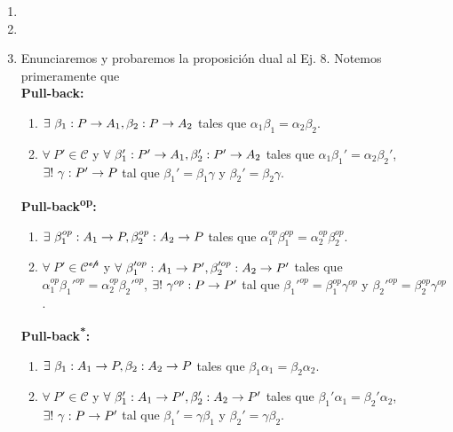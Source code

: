 \documentclass{article}
\begin{document}
\begin{enumerate}[label=\textbf{Ej \arabic*.}]
\begin{proof}
		\begin{equation*}
			\commutativesquare{up=t, P=A_2, A=P,B=A_2,C=A_1,D=A,f=\beta_2,g=\beta_1,h=\alpha_2,k=\alpha_1, l=1_{A_2},m=\alpha,n=\exists !\ \gamma,},
		\end{equation*}
		del cual se deduce que en partícular $\beta_2\gamma=1_{A_2}$, y así se tiene lo deseado.\\
		\end{proof}
		\item 
		\item
		\item Enunciaremos y probaremos la proposición dual al Ej. 8. Notemos primeramente que\\
		\textbf{Pull-back:}\begin{enumerate}[label=PB\Roman*)]
			\item $\exists\ \catarrow{\beta_1}{P}{A_1},\catarrow{\beta_2}{P}{A_2}$ tales que $\alpha_1\beta_1=\alpha_2\beta_2$.
			\item $\forall\ P'\in\mathscr{C}$ y $\forall\ \catarrow{\beta_1'}{P'}{A_1},\catarrow{\beta_2'}{P'}{A_2}$ tales que $\alpha_1\beta_1'=\alpha_2\beta_2'$, $\exists !\ \gamma:P'\to P$ tal que $\beta_1'=\beta_1\gamma$ y $\beta_2'=\beta_2\gamma$.
		\end{enumerate}
		\textbf{Pull-back\textsuperscript{op}:}\begin{enumerate}[label=PB\textsuperscript{op}\Roman*)]
		\item $\exists\ \catarrow{\beta_1^{op}}{A_1}{P},\catarrow{\beta_2^{op}}{A_2}{P}$ tales que $\alpha_1^{op}\beta_1^{op}=\alpha_2^{op}\beta_2^{op}$.
		\item $\forall\ P'\in\mathscr{C^{op}}$ y $\forall\ \catarrow{\beta_1'^{op}}{A_1}{P'},\catarrow{\beta_2'^{op}}{A_2}{P'}$ tales que $\alpha_1^{op}\beta_1'^{op}=\alpha_2^{op}\beta_2'^{op}$, $\exists !\ \catarrow{\gamma^{op}}{P}{P'}$ tal que $\beta_1'^{op}=\beta_1^{op}\gamma^{op}$ y $\beta_2'^{op}=\beta_2^{op}\gamma^{op}$.
	\end{enumerate}
	\textbf{Pull-back\textsuperscript{*}:}\begin{enumerate}[label=PB\textsuperscript{*}\Roman*)]
	\item $\exists\ \catarrow{\beta_1}{A_1}{P},\catarrow{\beta_2}{A_2}{P}$ tales que $\beta_1\alpha_1=\beta_2\alpha_2$.
	\item $\forall\ P'\in\mathscr{C}$ y $\forall\ \catarrow{\beta_1'}{A_1}{P'},\catarrow{\beta_2'}{A_2}{P'}$ tales que $\beta_1'\alpha_1=\beta_2'\alpha_2$, $\exists !\ \gamma:P\to P'$ tal que $\beta_1'=\gamma\beta_1$ y $\beta_2'=\gamma\beta_2$.

\end{enumerate}
\end{enumerate}
\end{document}

